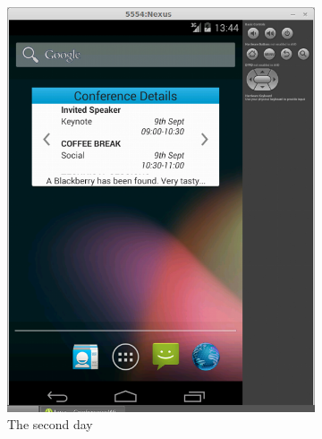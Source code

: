 \documentclass[11pt, a4paper]{article}
\begin{document}
\begin{figure}[h]
\begin{subfigure}[b]{0.3\textwidth}
\includegraphics[width=\textwidth]{img/running-day-2.png}
\caption{The second day}
\end{subfigure}
\begin{subfigure}[b]{0.3\textwidth}

\end{subfigure}
\end{figure}
\end{document}
